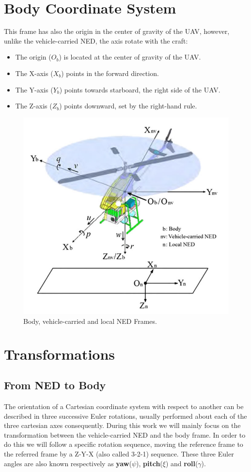 \section{Body Coordinate System}\label{sec:body}
This frame has also the origin in the center of gravity of the UAV, however, unlike the vehicle-carried NED, the axis rotate with the craft:
\begin{itemize}
\item{The origin (\textbf{$O_{b}$}) is located at the center of gravity of the UAV.}
\item{The X-axis (\textbf{$X_{b}$}) points in the forward direction.}
\item{The Y-axis (\textbf{$Y_{b}$}) points towards starboard, the right side of the UAV.}
\item{The Z-axis (\textbf{$Z_{b}$}) points downward, set by the right-hand rule.}
\end{itemize}
\begin{figure}[H]
   \centering
    \includegraphics[width=.70\textwidth]{figures/NEDtemp1.png} 
    \caption{Body, vehicle-carried and local NED Frames.}  
    \label{fig:NED1}
\end{figure}

\section{Transformations}\label{sec:body}

\subsection*{From NED to Body}
\paragraph{} The orientation of a Cartesian coordinate system with respect to another can be described in three successive Euler rotations, usually performed about each of the three cartesian axes consequently. During this work we will mainly focus on the transformation between the vehicle-carried NED and the body frame. In order to do this we will follow a specific rotation sequence, moving the reference frame to the referred frame by a Z-Y-X (also called 3-2-1) sequence. These three Euler angles are also known respectively as \textbf{yaw}($\psi$), \textbf{pitch}($\xi$) and \textbf{roll}($\gamma$).

